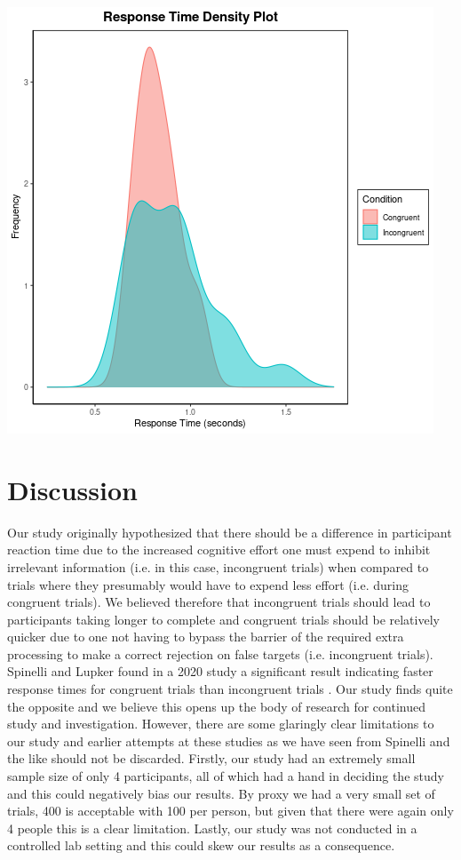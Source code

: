\documentclass{article}
\begin{document}
\begin{center}
\includegraphics[width=.9\linewidth]{converted_stroop3.png}
\end{center}


\section{Discussion}
\label{sec:org696bea0}

\hspace{1em} Our study originally hypothesized that there should be a difference in participant reaction time due to the increased cognitive effort one must expend to inhibit irrelevant information (i.e. in this case, incongruent trials) when compared to trials where they presumably would have to expend less effort (i.e. during congruent trials). We believed therefore that incongruent trials should lead to participants taking longer to complete and congruent trials should be relatively quicker due to one not having to bypass the barrier of the required extra processing to make a correct rejection on false targets (i.e. incongruent trials). Spinelli and Lupker found in a 2020 study a significant result indicating faster response times for congruent trials than incongruent trials \cite{SpinelliGiacomo2020I}. Our study finds quite the opposite and we believe this opens up the body of research for continued study and investigation. However, there are some glaringly clear limitations to our study and earlier attempts at these studies as we have seen from Spinelli and the like should not be discarded. Firstly, our study had an extremely small sample size of only 4 participants, all of which had a hand in deciding the study and this could negatively bias our results. By proxy we had a very small set of trials, 400 is acceptable with 100 per person, but given that there were again only 4 people this is a clear limitation. Lastly, our study was not conducted in a controlled lab setting and this could skew our results as a consequence. 


\end{document}
